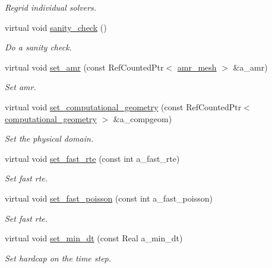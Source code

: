 \begin{DoxyCompactItemize}
\begin{DoxyCompactList}\small\item\em Regrid individual solvers. \end{DoxyCompactList}\item 
virtual void \hyperlink{classtime__stepper_a6f176a71d27d81c5f46ee6c27de48084}{sanity\+\_\+check} ()
\begin{DoxyCompactList}\small\item\em Do a sanity check. \end{DoxyCompactList}\item 
virtual void \hyperlink{classtime__stepper_afd82c36647cd14a8362b2e24dc5d16bb}{set\+\_\+amr} (const Ref\+Counted\+Ptr$<$ \hyperlink{classamr__mesh}{amr\+\_\+mesh} $>$ \&a\+\_\+amr)
\begin{DoxyCompactList}\small\item\em Set amr. \end{DoxyCompactList}\item 
virtual void \hyperlink{classtime__stepper_aacd2b52725a336defa0ee80b79145ffc}{set\+\_\+computational\+\_\+geometry} (const Ref\+Counted\+Ptr$<$ \hyperlink{classcomputational__geometry}{computational\+\_\+geometry} $>$ \&a\+\_\+compgeom)
\begin{DoxyCompactList}\small\item\em Set the physical domain. \end{DoxyCompactList}\item 
virtual void \hyperlink{classtime__stepper_a8847d9da77783f7471d15ae43d390969}{set\+\_\+fast\+\_\+rte} (const int a\+\_\+fast\+\_\+rte)
\begin{DoxyCompactList}\small\item\em Set fast rte. \end{DoxyCompactList}\item 
virtual void \hyperlink{classtime__stepper_a958cb4e0b186b13abe2f6c172d7a49fd}{set\+\_\+fast\+\_\+poisson} (const int a\+\_\+fast\+\_\+poisson)
\begin{DoxyCompactList}\small\item\em Set fast rte. \end{DoxyCompactList}\item 
virtual void \hyperlink{classtime__stepper_ac603f5f8b6d4481d24b77210f33b2394}{set\+\_\+min\+\_\+dt} (const Real a\+\_\+min\+\_\+dt)
\begin{DoxyCompactList}\small\item\em Set hardcap on the time step. \end{DoxyCompactList}\item 

\end{DoxyCompactItemize}
